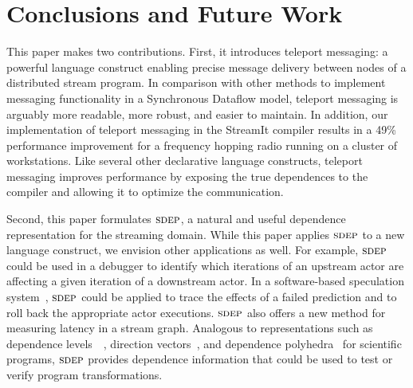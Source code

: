 \section{Conclusions and Future Work}
\label{sec:conclusion}

This paper makes two contributions.  First, it introduces teleport
messaging: a powerful language construct enabling precise message
delivery between nodes of a distributed stream program.  In comparison
with other methods to implement messaging functionality in a
Synchronous Dataflow model, teleport messaging is arguably more
readable, more robust, and easier to maintain.  In addition, our
implementation of teleport messaging in the StreamIt compiler results
in a 49\% performance improvement for a frequency hopping radio
running on a cluster of workstations.  Like several other declarative
language constructs, teleport messaging improves performance by
exposing the true dependences to the compiler and allowing it to
optimize the communication.


Second, this paper formulates $\textsc{sdep}$, a natural and useful dependence
representation for the streaming domain.  While this paper applies
$\textsc{sdep}$ to a new language construct, we envision other applications as
well.  For example, $\textsc{sdep}$ could be used in a debugger to identify
which iterations of an upstream actor are affecting a given iteration
of a downstream actor.  In a software-based speculation
system~\cite{frank-thesis}, $\textsc{sdep}$ could be applied to trace the
effects of a failed prediction and to roll back the appropriate actor
executions.  $\textsc{sdep}$ also offers a new method for measuring latency in
a stream graph.  Analogous to representations such as dependence
levels~~\cite{AK82}, direction vectors~\cite{wolfe82}, and dependence
polyhedra~\cite{Irig88} for scientific programs, $\textsc{sdep}$ provides
dependence information that could be used to test or verify program
transformations.

